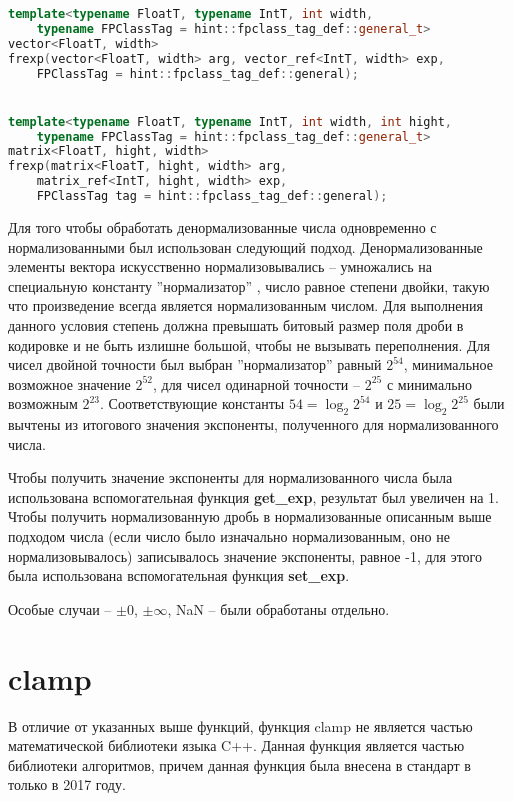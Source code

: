 \begin{lstlisting}[caption={Объявления перегрузок функции frexp в стандартной библиотеке языка CM},captionpos=b,language=C++]
template<typename FloatT, typename IntT, int width,
    typename FPClassTag = hint::fpclass_tag_def::general_t>
vector<FloatT, width>
frexp(vector<FloatT, width> arg, vector_ref<IntT, width> exp,
    FPClassTag = hint::fpclass_tag_def::general);


template<typename FloatT, typename IntT, int width, int hight,
    typename FPClassTag = hint::fpclass_tag_def::general_t>
matrix<FloatT, hight, width>
frexp(matrix<FloatT, hight, width> arg,
    matrix_ref<IntT, hight, width> exp,
    FPClassTag tag = hint::fpclass_tag_def::general);
\end{lstlisting}

Для того чтобы обработать денормализованные числа одновременно с нормализованными был использован следующий подход.
Денормализованные элементы вектора искусственно нормализовывались -- умножались на специальную константу ''нормализатор'' , число равное степени двойки, такую что произведение всегда является нормализованным числом.
Для выполнения данного условия степень должна превышать битовый размер поля дроби в кодировке и не быть излишне большой, чтобы не вызывать переполнения.
Для чисел двойной точности был выбран ''нормализатор'' равный $2^{54}$, минимальное возможное значение $2^{52}$, для чисел одинарной точности -- $2^{25}$ с минимально возможным $2^{23}$.
Соответствующие константы $54=\log_{2}2^{54}$ и $25=\log_{2}2^{25}$ были вычтены из итогового значения экспоненты, полученного для нормализованного числа.

Чтобы получить значение экспоненты для нормализованного числа была использована вспомогательная функция \textbf{get\_exp}, результат был увеличен на 1.
Чтобы получить нормализованную дробь в нормализованные описанным выше подходом числа (если число было изначально нормализованным, оно не нормализовывалось) записывалось значение экспоненты, равное -1, для этого была использована вспомогательная функция \textbf{set\_exp}.

Особые случаи -- $\pm 0$, $\pm \infty$, NaN -- были обработаны отдельно.

\section{clamp}

В отличие от указанных выше функций, функция clamp не является частью математической библиотеки языка C++.
Данная функция является частью библиотеки алгоритмов, причем данная функция была внесена в стандарт в только в 2017 году\cite{c++17}.

